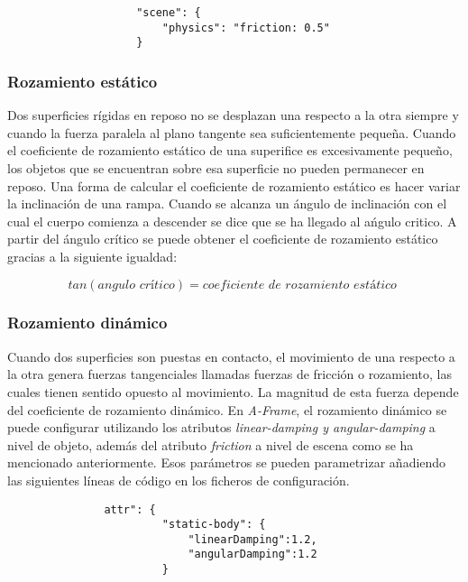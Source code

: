 \begin{verbatim}
                    "scene": {
                        "physics": "friction: 0.5"
                    }
\end{verbatim}

\subsubsection{Rozamiento estático}
Dos superficies rígidas en reposo no se desplazan una respecto a la otra siempre y cuando la fuerza paralela al plano tangente sea suficientemente pequeña. Cuando el coeficiente de rozamiento estático de una superifice es excesivamente pequeño, los objetos que se encuentran sobre esa superficie no pueden permanecer en reposo. Una forma de calcular el coeficiente de rozamiento estático es hacer variar la inclinación de una rampa. Cuando se alcanza un ángulo de inclinación con el cual el cuerpo comienza a descender se dice que se ha llegado al ańgulo critico. A partir del ángulo crítico se puede obtener el coeficiente de rozamiento estático gracias a la siguiente igualdad:

\begin{equation}
    tan(angulo \,\, crítico) = coeficiente \,\, de \,\, rozamiento \,\, estático \,\,
\end{equation}

\subsubsection{Rozamiento dinámico}
Cuando dos superficies son puestas en contacto, el movimiento de una respecto a la otra genera fuerzas tangenciales llamadas fuerzas de fricción o rozamiento, las cuales tienen sentido opuesto al movimiento. La magnitud de esta fuerza depende del coeficiente de rozamiento dinámico. En \textit{A-Frame}, el rozamiento dinámico se puede configurar utilizando los atributos \textit{linear-damping y angular-damping} a nivel de objeto, además del atributo \textit{friction} a nivel de escena como se ha mencionado anteriormente. Esos parámetros se pueden parametrizar añadiendo las siguientes líneas de código en los ficheros de configuración.

\begin{verbatim}
               attr": {
                        "static-body": {
                            "linearDamping":1.2,
                            "angularDamping":1.2
                        }
\end{verbatim}


